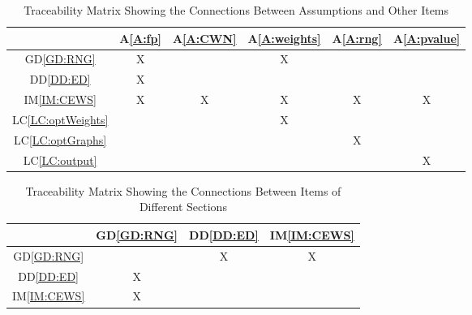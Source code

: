 \documentclass[12pt]{article}
\newcommand{\dref}[1]{GD\ref{#1}}
\newcommand{\ddref}[1]{DD\ref{#1}}
\newcommand{\aref}[1]{A\ref{#1}}
\newcommand{\iref}[1]{IM\ref{#1}}
\newcommand{\lcref}[1]{LC\ref{#1}}
\begin{document}



\begin{table}[h!]
\centering
\begin{tabular}{|c|c|c|c|c|c|}
\hline
	& \aref{A:fp} & \aref{A:CWN} & \aref{A:weights} & \aref{A:rng} & \aref{A:pvalue} \\
\hline
\dref{GD:RNG}             &X& &X& &  \\ \hline
\ddref{DD:ED}             &X& & & &  \\ \hline
\iref{IM:CEWS}            &X&X&X&X&X \\ \hline
\lcref{LC:optWeights}     & & &X& &  \\ \hline
\lcref{LC:optGraphs}      & & & &X&  \\ \hline
\lcref{LC:output}         & & & & &X  \\ \hline
\end{tabular}
\caption{Traceability Matrix Showing the Connections Between Assumptions and Other Items}
\label{Table:A_trace}
\end{table}

\begin{table}[H]
\centering
\begin{tabular}{|c|c|c|c|}
\hline        
	& \dref{GD:RNG} & \ddref{DD:ED}  & \iref{IM:CEWS}  \\
\hline
\dref{GD:RNG}    & &X&X \\ \hline
\ddref{DD:ED}    &X& &  \\ \hline
\iref{IM:CEWS}   &X& &  \\ \hline
\end{tabular}

\caption{Traceability Matrix Showing the Connections Between Items of Different Sections}
\label{Table:trace}
\end{table}
\end{document}
